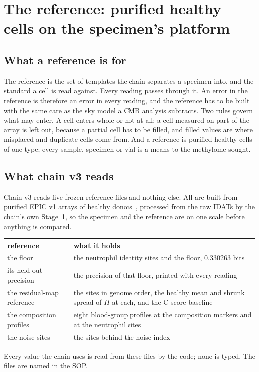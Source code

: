 \chapter{The reference: purified healthy cells on the specimen's platform}\label{ch:atlas}

\section{What a reference is for}

The reference is the set of templates the chain separates a specimen into, and the standard a cell is read against. Every reading passes
through it. An error in the reference is therefore an error in every reading, and the reference has to be built with the same care as the sky
model a CMB analysis subtracts. Two rules govern what may enter. A cell enters whole or not at all: a cell measured on part of the array is
left out, because a partial cell has to be filled, and filled values are where misplaced and duplicate cells come from. And a reference is
purified healthy cells of one type; every sample, specimen or vial is a means to the methylome sought.

\section{What chain v3 reads}

Chain v3 reads five frozen reference files and nothing else. All are built from
purified EPIC v1 arrays of healthy donors~\cite{Salas2018,Salas2022}, processed from the raw IDATs by the chain's own Stage~1, so the specimen and the
reference are on one scale before anything is compared.

\begin{center}\small
\begin{tabular}{@{}p{}p{}@{}}\toprule
reference & what it holds \\\midrule
the floor & the neutrophil identity sites and the floor, 0.330263 bits \\
its held-out precision & the precision of that floor, printed with every reading \\
the residual-map reference & the sites in genome order, the healthy mean and shrunk spread of $H$ at each, and the C-score baseline \\
the composition profiles & eight blood-group profiles at the composition markers and at the neutrophil sites \\
the noise sites & the sites behind the noise index \\\bottomrule
\end{tabular}
\end{center}
\calibrated{} Every value the chain uses is read from these files by the code; none is typed. The files are named in the SOP.

